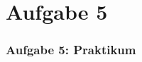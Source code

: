 \documentclass[accentcolor=tud9c,colorbacktitle,inverttitle,landscape,german,presentation,t]{tudbeamer}
\begin{document}
\section{Aufgabe 5}
\begin{frame}
	\frametitle{Aufgabe 5: Praktikum}
\end{frame}
\end{document}
